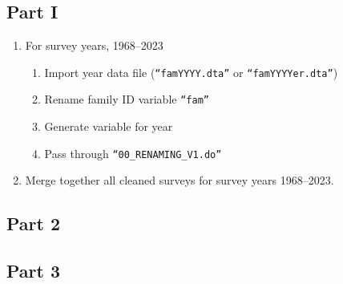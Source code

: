 \documentclass[12pt]{article}
\begin{document}
\subsection*{Part I}

\begin{enumerate}
    \item For survey years, 1968--2023
    \begin{enumerate}[label=\arabic*.]
        \item Import year data file (\texttt{``famYYYY.dta''} or \texttt{``famYYYYer.dta''})
        \item Rename family ID variable \texttt{``fam''}
        \item Generate variable for year
        \item Pass through \texttt{``00\_RENAMING\_V1.do''}
    \end{enumerate}
    \item Merge together all cleaned surveys for survey years 1968--2023.
\end{enumerate}

\subsection*{Part 2}

\subsection*{Part 3}
\end{document}
